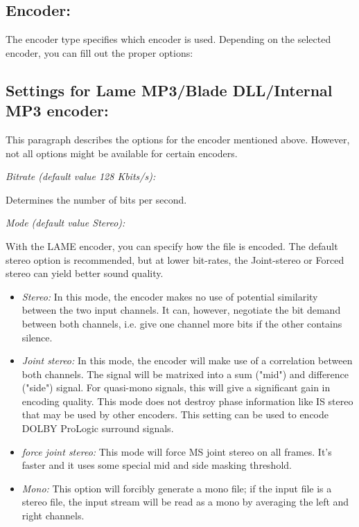 \subsection{Encoder:}

The encoder type specifies which encoder is used. Depending on the selected
encoder, you can fill out the proper options:


\subsection{Settings for Lame MP3/Blade DLL/Internal MP3 encoder:}
\label{lamesettings}

This paragraph describes the options for the encoder mentioned above. However,
not all options might be available for certain encoders.

{\it Bitrate (default value 128 Kbits/s):}

Determines the number of bits per second.


{\it Mode (default value Stereo):}

With the LAME encoder, you can specify how the file is encoded. The default
stereo option is recommended, but at lower bit-rates, the Joint-stereo or
Forced stereo can yield better sound quality.

\begin{itemize}
\item {\it Stereo:} In this mode, the encoder makes no use of
potential similarity between the two input channels. It can,
however, negotiate the bit demand between both channels, i.e. give one channel
more bits if the other contains silence.
\item {\it Joint stereo:} In this mode, the encoder will
make use of a correlation between both channels. The signal will be matrixed
into a sum ("mid") and difference ("side") signal. For quasi-mono signals,
this will give a significant gain in encoding quality. This mode does not
destroy phase information like IS stereo that may be used by other encoders.
This setting can be used to encode DOLBY ProLogic surround signals.
\item {\it force joint stereo:}  This mode will force
MS joint stereo on all frames. It's faster and it uses some special mid and side
masking threshold.
\item {\it Mono:} This option will forcibly generate a mono file; if the input file is
a stereo file, the input stream will be read as a mono by averaging the left
and right channels.
\end{itemize}

